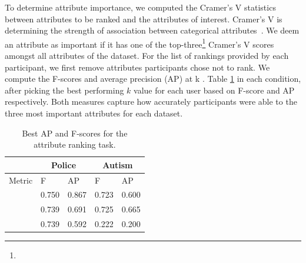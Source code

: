 To determine  attribute importance, 
we computed the Cramer's V statistics 
between attributes to be ranked 
and the attributes of interest. 
Cramer's V is  
determining 
the strength of association between categorical attributes~\cite{McHugh2013}. We deem an attribute as important if it has one 
of the top-three\footnote{} Cramer's V scores amongst all attributes of the dataset. 
For the list of rankings provided by each participant, 
we first remove attributes  participants chose not to rank. 
We compute the F-scores and average precision (AP) at k 
. 
Table \ref{table:ranking_results}  in each condition, after picking the best performing $k$ value for each user based on F-score and AP respectively. Both measures capture how accurately participants were able to  
the three most important attributes for each dataset.
\begin{table}[ht!]
	\centering
	\vspace{-10pt}
	\begin{tabular}{lllll}
	         & \multicolumn{2}{c}{Police}                                   & \multicolumn{2}{c}{Autism}                                   \\ \hline
	Metric   & F                             & AP                            & F                             & AP                            \\ \hline
	\system  & \cellcolor{blue!25}0.750 & \cellcolor{blue!25}0.867 & 0.723                         & 0.600                         \\ 
	\cluster & 0.739                         & 0.691                         & \cellcolor{blue!25}0.725 & \cellcolor{blue!25}0.665 \\
	\BFS     & 0.739                         & 0.592                         & 0.222                         & 0.200                         \\ 
	\end{tabular}
	\caption{Best AP and F-scores for the attribute ranking task.}
	\label{table:ranking_results}
	\vspace{-20pt}
\end{table}
